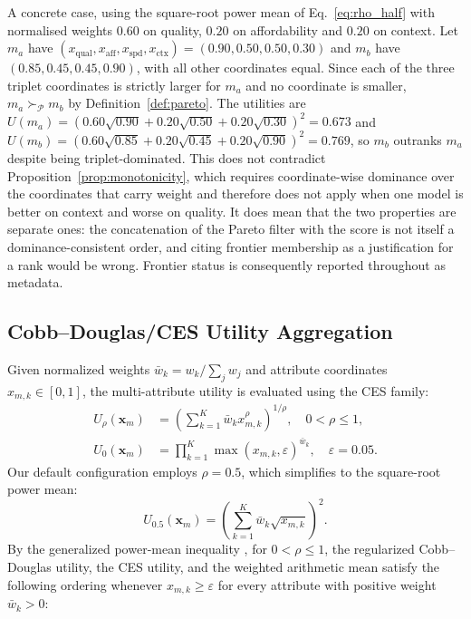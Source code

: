 \documentclass[pdflatex,sn-mathphys-num]{sn-jnl}
\theoremstyle{thmstyleone}
\theoremstyle{thmstylethree}
\begin{document}
A concrete case, using the square-root power mean of Eq.~\ref{eq:rho_half} with normalised weights $0.60$ on quality, $0.20$ on affordability and $0.20$ on context. Let $m_a$ have $(x_{\text{qual}}, x_{\text{aff}}, x_{\text{spd}}, x_{\text{ctx}}) = (0.90, 0.50, 0.50, 0.30)$ and $m_b$ have $(0.85, 0.45, 0.45, 0.90)$, with all other coordinates equal. Since each of the three triplet coordinates is strictly larger for $m_a$ and no coordinate is smaller, $m_a \succ_{\mathcal{P}} m_b$ by Definition~\ref{def:pareto}. The utilities are $U(m_a) = (0.60\sqrt{0.90} + 0.20\sqrt{0.50} + 0.20\sqrt{0.30})^2 = 0.673$ and $U(m_b) = (0.60\sqrt{0.85} + 0.20\sqrt{0.45} + 0.20\sqrt{0.90})^2 = 0.769$, so $m_b$ outranks $m_a$ despite being triplet-dominated. This does not contradict Proposition~\ref{prop:monotonicity}, which requires coordinate-wise dominance over the coordinates that carry weight and therefore does not apply when one model is better on context and worse on quality. It does mean that the two properties are separate ones: the concatenation of the Pareto filter with the score is not itself a dominance-consistent order, and citing frontier membership as a justification for a rank would be wrong. Frontier status is consequently reported throughout as metadata.

\subsection{Cobb--Douglas/CES Utility Aggregation}\label{subsec:ces}

Given normalized weights $\bar{w}_k = w_k / \sum_j w_j$ and attribute coordinates $x_{m, k} \in [0, 1]$, the multi-attribute utility is evaluated using the CES family:
\begin{align}
U_\rho(\mathbf{x}_m) &= \left( \sum_{k=1}^K \bar{w}_k x_{m, k}^\rho \right)^{1/\rho}, \quad 0 < \rho \le 1, \label{eq:ces_formula} \\
U_0(\mathbf{x}_m) &= \prod_{k=1}^K \max(x_{m, k}, \varepsilon)^{\bar{w}_k}, \quad \varepsilon = 0.05. \label{eq:cd_formula}
\end{align}
Our default configuration employs $\rho = 0.5$, which simplifies to the square-root power mean:
\begin{equation}\label{eq:rho_half}
U_{0.5}(\mathbf{x}_m) = \left( \sum_{k=1}^K \bar{w}_k \sqrt{x_{m, k}} \right)^2.
\end{equation}
By the generalized power-mean inequality \cite{hardy1934inequalities},
for $0 < \rho \leq 1$, the regularized Cobb--Douglas utility,
the CES utility, and the weighted arithmetic mean satisfy the
following ordering whenever $x_{m,k} \geq \varepsilon$ for every
attribute with positive weight $\bar{w}_k > 0$:
\end{document}
